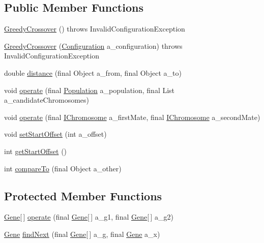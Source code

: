 \subsection*{Public Member Functions}
\begin{DoxyCompactItemize}
\item 
\hyperlink{classorg_1_1jgap_1_1impl_1_1_greedy_crossover_a5777f6e13508c61d2c1e43ee0900cbf3}{Greedy\-Crossover} ()  throws Invalid\-Configuration\-Exception 
\item 
\hyperlink{classorg_1_1jgap_1_1impl_1_1_greedy_crossover_a2592b70d785e0344ac6cbc23d10c7864}{Greedy\-Crossover} (\hyperlink{classorg_1_1jgap_1_1_configuration}{Configuration} a\-\_\-configuration)  throws Invalid\-Configuration\-Exception 
\item 
double \hyperlink{classorg_1_1jgap_1_1impl_1_1_greedy_crossover_a41deed206eb483d92e5dee7d0bf537ef}{distance} (final Object a\-\_\-from, final Object a\-\_\-to)
\item 
void \hyperlink{classorg_1_1jgap_1_1impl_1_1_greedy_crossover_a57adb8d442035ecae43e194f29dff43c}{operate} (final \hyperlink{classorg_1_1jgap_1_1_population}{Population} a\-\_\-population, final List a\-\_\-candidate\-Chromosomes)
\item 
void \hyperlink{classorg_1_1jgap_1_1impl_1_1_greedy_crossover_a9fc2e11874fbc8b8349c1a0d93a8b5d9}{operate} (final \hyperlink{interfaceorg_1_1jgap_1_1_i_chromosome}{I\-Chromosome} a\-\_\-first\-Mate, final \hyperlink{interfaceorg_1_1jgap_1_1_i_chromosome}{I\-Chromosome} a\-\_\-second\-Mate)
\item 
void \hyperlink{classorg_1_1jgap_1_1impl_1_1_greedy_crossover_a6f518b090d9a358f7d96b7b11e6bf785}{set\-Start\-Offset} (int a\-\_\-offset)
\item 
int \hyperlink{classorg_1_1jgap_1_1impl_1_1_greedy_crossover_a6d4b71a26f742714520a6dfa931cc8c2}{get\-Start\-Offset} ()
\item 
int \hyperlink{classorg_1_1jgap_1_1impl_1_1_greedy_crossover_ab1cb7c568f154dba5f43311e2c75ccfe}{compare\-To} (final Object a\-\_\-other)
\end{DoxyCompactItemize}
\subsection*{Protected Member Functions}
\begin{DoxyCompactItemize}
\item 
\hyperlink{interfaceorg_1_1jgap_1_1_gene}{Gene}\mbox{[}$\,$\mbox{]} \hyperlink{classorg_1_1jgap_1_1impl_1_1_greedy_crossover_a6a19fa44501e6bd2d3e5be8ba7424b3a}{operate} (final \hyperlink{interfaceorg_1_1jgap_1_1_gene}{Gene}\mbox{[}$\,$\mbox{]} a\-\_\-g1, final \hyperlink{interfaceorg_1_1jgap_1_1_gene}{Gene}\mbox{[}$\,$\mbox{]} a\-\_\-g2)
\item 
\hyperlink{interfaceorg_1_1jgap_1_1_gene}{Gene} \hyperlink{classorg_1_1jgap_1_1impl_1_1_greedy_crossover_abb3111b92c3d771a9a4d5320071259a6}{find\-Next} (final \hyperlink{interfaceorg_1_1jgap_1_1_gene}{Gene}\mbox{[}$\,$\mbox{]} a\-\_\-g, final \hyperlink{interfaceorg_1_1jgap_1_1_gene}{Gene} a\-\_\-x)
\end{DoxyCompactItemize}

